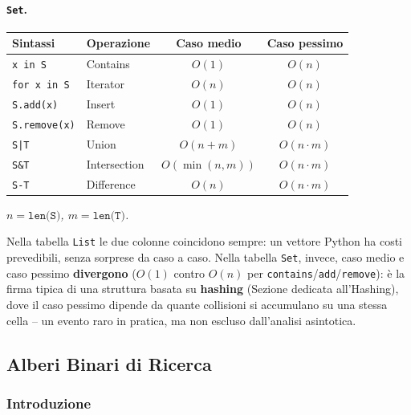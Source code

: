 \documentclass[12pt, a4paper]{article}
\begin{document}
\paragraph{\texttt{Set}.}
\begin{center}
\small
\begin{tabular}{llcc}
\toprule
\textbf{Sintassi} & \textbf{Operazione} & \textbf{Caso medio} & \textbf{Caso pessimo} \\
\midrule
\texttt{x in S} & Contains & $O(1)$ & $O(n)$ \\
\texttt{for x in S} & Iterator & $O(n)$ & $O(n)$ \\
\texttt{S.add(x)} & Insert & $O(1)$ & $O(n)$ \\
\texttt{S.remove(x)} & Remove & $O(1)$ & $O(n)$ \\
\texttt{S|T} & Union & $O(n+m)$ & $O(n\cdot m)$ \\
\texttt{S\&T} & Intersection & $O(\min(n,m))$ & $O(n\cdot m)$ \\
\texttt{S-T} & Difference & $O(n)$ & $O(n\cdot m)$ \\
\bottomrule
\end{tabular}
\end{center}
\textit{$n=\texttt{len(S)}$, $m=\texttt{len(T)}$.}

\begin{tcolorbox}[colback=lightergray!5, colframe=tocsubsec, title=\textbf{Nota mia (non nella slide): perché ``Caso pessimo'' e non ``ammortizzato'' per \texttt{Set}?}]
Nella tabella \texttt{List} le due colonne coincidono sempre: un vettore Python ha costi prevedibili, senza sorprese da caso a caso. Nella tabella \texttt{Set}, invece, caso medio e caso pessimo \textbf{divergono} ($O(1)$ contro $O(n)$ per \texttt{contains}/\texttt{add}/\texttt{remove}): è la firma tipica di una struttura basata su \textbf{hashing} (Sezione dedicata all'Hashing), dove il caso pessimo dipende da quante collisioni si accumulano su una stessa cella -- un evento raro in pratica, ma non escluso dall'analisi asintotica.
\end{tcolorbox}


\subsection{Alberi Binari di Ricerca}
\label{sec:abr}

\subsubsection{Introduzione}
\end{document}
